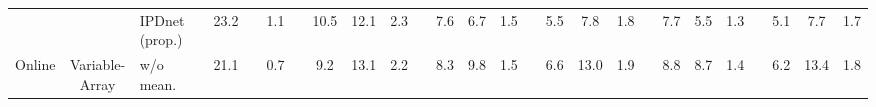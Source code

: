 \documentclass[lettersize,journal]{IEEEtran}
\begin{document}
\begin{table}[]
\begin{tabular}{lcllclccccccccccccccccccccc}
                          &                                                                                  & \cellcolor[HTML]{EFEFEF}IPDnet (prop.) &  & \cellcolor[HTML]{EFEFEF}23.2                                               &  & \cellcolor[HTML]{EFEFEF}1.1                                                   &  & \cellcolor[HTML]{EFEFEF}10.5                           & \cellcolor[HTML]{EFEFEF}12.1                  & \cellcolor[HTML]{EFEFEF}2.3                           &  & \cellcolor[HTML]{EFEFEF}7.6                   & \cellcolor[HTML]{EFEFEF}6.7                   & \cellcolor[HTML]{EFEFEF}1.5                  &  & \cellcolor[HTML]{EFEFEF}5.5                   & \cellcolor[HTML]{EFEFEF}7.8                   & \cellcolor[HTML]{EFEFEF}1.8                  &  & \cellcolor[HTML]{EFEFEF}7.7                   & \cellcolor[HTML]{EFEFEF}5.5                   & \cellcolor[HTML]{EFEFEF}1.3                  &  & \cellcolor[HTML]{EFEFEF}5.1                   & \cellcolor[HTML]{EFEFEF}7.7                   & \cellcolor[HTML]{EFEFEF}1.7                  \\ 
\multirow{-4}{*}{Online}  & \multirow{-2}{*}{Variable-Array}                                                     & \quad w/o mean.                            &  & 21.1                                                                        &  & 0.7                                                                           &  & 9.2                                           & 13.1                                                   & 2.2                                          &  & 8.3                                                    & 9.8                                                    & 1.5                                          &  & 6.6                                                    & 13.0                                                     & 1.9                                                   &  & 8.8                                                    & 8.7                                                    & 1.4                                                   &  & 6.2                                                    & 13.4                                                   & 1.8                                                   \\ \midrule \midrule

\end{tabular}
\end{table}
\end{document}
